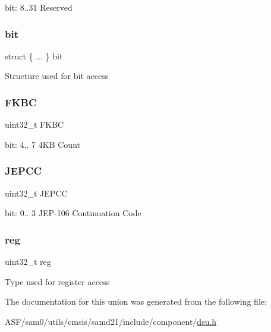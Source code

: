bit\+: 8..31 Reserved \mbox{\label{union_d_s_u___p_i_d4___type_af8879b4d351e037d0a77898b3fb681b9}} 
\subsubsection{\texorpdfstring{bit}{bit}}
{\footnotesize\ttfamily struct \{ ... \}   bit}

Structure used for bit access \mbox{\label{union_d_s_u___p_i_d4___type_a45b73f7720c1b8b402d327cdf09ed7e7}} 
\subsubsection{\texorpdfstring{FKBC}{FKBC}}
{\footnotesize\ttfamily uint32\+\_\+t F\+K\+BC}

bit\+: 4.. 7 4KB Count \mbox{\label{union_d_s_u___p_i_d4___type_a2ba9c1edf4631b95ad43c26007a2343b}} 
\subsubsection{\texorpdfstring{JEPCC}{JEPCC}}
{\footnotesize\ttfamily uint32\+\_\+t J\+E\+P\+CC}

bit\+: 0.. 3 J\+E\+P-\/106 Continuation Code \mbox{\label{union_d_s_u___p_i_d4___type_a6b91636401516a477989a336376d7b40}} 
\subsubsection{\texorpdfstring{reg}{reg}}
{\footnotesize\ttfamily uint32\+\_\+t reg}

Type used for register access 

The documentation for this union was generated from the following file\+:\begin{DoxyCompactItemize}
\item 
A\+S\+F/sam0/utils/cmsis/samd21/include/component/\mbox{\hyperlink{component_2dsu_8h}{dsu.\+h}}\end{DoxyCompactItemize}

